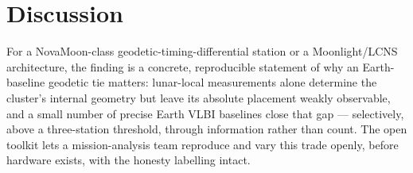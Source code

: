 \section{Discussion}

For a NovaMoon-class geodetic-timing-differential station or a Moonlight/LCNS
architecture, the finding is a concrete, reproducible statement of why an
Earth-baseline geodetic tie matters: lunar-local measurements alone determine
the cluster's internal geometry but leave its absolute placement weakly
observable, and a small number of precise Earth VLBI baselines close that gap ---
selectively, above a three-station threshold, through information rather than
count. The open toolkit lets a mission-analysis team reproduce and vary this
trade openly, before hardware exists, with the honesty labelling intact.
